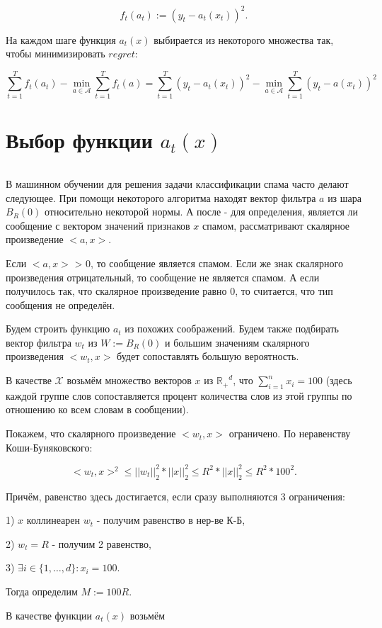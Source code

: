 \documentclass[12pt]{article}
\theoremstyle{definition}
\begin{document}
$$f_t(a_t) := (y_t-a_t(x_t))^2.$$

На каждом шаге функция $a_t(x)$ выбирается из некоторого множества так, чтобы минимизировать $regret$:

$$\sum\limits_{t=1}^T f_t(a_t) - \min\limits_{a \in \mathcal{A}} \sum\limits_{t=1}^T f_t(a) = \sum\limits_{t=1}^T (y_t-a_t(x_t))^2 - \min\limits_{a \in \mathcal{A}} \sum\limits_{t=1}^T (y_t-a(x_t))^2$$

\section*{Выбор функции $a_t(x)$}
$ $


В машинном обучении для решения задачи классификации спама часто делают следующее. При помощи некоторого алгоритма находят вектор фильтра $a$ из шара $B_R(0)$ относительно некоторой нормы. А после - для определения, является ли сообщение с вектором значений признаков $x$ спамом, рассматривают скалярное произведение $<a, x>$.

Если $<a, x>$ > 0, то сообщение является спамом. Если же знак скалярного произведения отрицательный, то сообщение не является спамом. А если получилось так, что скалярное произведение равно 0, то считается, что тип сообщения не определён.

Будем строить функцию $a_t$ из похожих соображений. Будем также подбирать вектор фильтра $w_t$ из $W := B_R(0)$ и большим значениям скалярного произведения $<w_t, x>$ будет сопоставлять большую вероятность.

В качестве $\mathcal{X}$ возьмём множество векторов $x$ из $\mathbb{R_{+}}^d$, что $\sum\limits_{i=1}^n x_i = 100$ (здесь каждой группе слов сопоставляется процент количества слов из этой группы по отношению ко всем словам в сообщении).

Покажем, что скалярного произведение $<w_t, x>$ ограничено. По неравенству Коши-Буняковского:

$$<w_t, x>^2 \leq ||w_t||_2^2*||x||_2^2 \leq R^2*||x||_2^2 \leq R^2*100^2.$$

Причём, равенство здесь достигается, если сразу выполняются 3 ограничения:

1) $x$ коллинеарен $w_t$ - получим равенство в нер-ве К-Б,

2) $w_t=R$ - получим 2 равенство,

3) $\exists i \in \{1, \dots, d\}: x_i = 100$.

Тогда определим $M := 100R$.

В качестве функции $a_t(x)$ возьмём
\end{document}
